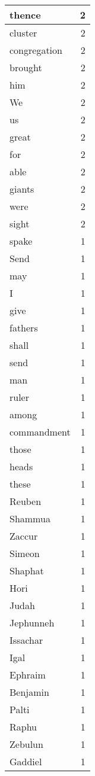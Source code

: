 \begin{center}
\begin{longtable}{l|r}
thence & 2\\ \hline 
cluster & 2\\ \hline 
congregation & 2\\ \hline 
brought & 2\\ \hline 
him & 2\\ \hline 
We & 2\\ \hline 
us & 2\\ \hline 
great & 2\\ \hline 
for & 2\\ \hline 
able & 2\\ \hline 
giants & 2\\ \hline 
were & 2\\ \hline 
sight & 2\\ \hline 
spake & 1\\ \hline 
Send & 1\\ \hline 
may & 1\\ \hline 
I & 1\\ \hline 
give & 1\\ \hline 
fathers & 1\\ \hline 
shall & 1\\ \hline 
send & 1\\ \hline 
man & 1\\ \hline 
ruler & 1\\ \hline 
among & 1\\ \hline 
commandment & 1\\ \hline 
those & 1\\ \hline 
heads & 1\\ \hline 
these & 1\\ \hline 
Reuben & 1\\ \hline 
Shammua & 1\\ \hline 
Zaccur & 1\\ \hline 
Simeon & 1\\ \hline 
Shaphat & 1\\ \hline 
Hori & 1\\ \hline 
Judah & 1\\ \hline 
Jephunneh & 1\\ \hline 
Issachar & 1\\ \hline 
Igal & 1\\ \hline 
Ephraim & 1\\ \hline 
Benjamin & 1\\ \hline 
Palti & 1\\ \hline 
Raphu & 1\\ \hline 
Zebulun & 1\\ \hline 
Gaddiel & 1\\ \hline 

\end{longtable}
\end{center}
